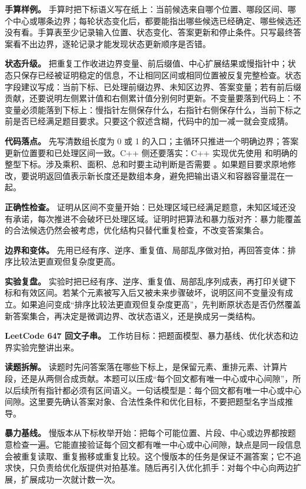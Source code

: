 \textbf{手算样例。} 手算时把下标语义写在纸上：当前候选来自哪个位置、哪段区间、哪个中心或哪条边界；每轮状态变化后，都要能指出哪些候选已经确定、哪些候选还没有看。手算表至少记录输入位置、状态变化、答案更新和停止条件。只写最终答案看不出边界，逐轮记录才能发现状态更新顺序是否错。

\textbf{状态升级。} 把重复工作收进边界变量、前后缀值、中心扩展结果或慢指针中；状态只保存已经被证明稳定的信息，不让相同区间或相同位置被反复完整检查。状态字段建议写成：当前下标、已处理前缀边界、未知区边界、答案变量；若有前后缀贡献，还要说明左侧累计值和右侧累计值分别何时更新。不变量要落到代码上：不变量必须能落到下标上：慢指针左侧保存什么，右指针右侧保存什么，当前下标之前是否已经满足题目要求。只要这个叙述含糊，代码中的加一减一就会变成猜。

\textbf{代码落点。} 先写清数组长度为 0 或 1 的入口；主循环只推进一个明确边界；答案更新位置要和已处理区间一致。C++ 侧还要落实：C++ 实现优先使用  和明确的整型下标。涉及乘积、面积、总和时要主动判断是否需要 。如果题目要求原地修改，要说明返回值表示新长度还是数组本身，避免把输出语义和容器容量混在一起。

\textbf{正确性检查。} 证明从区间不变量开始：已处理区域已经满足题意，未知区域还没有承诺，每次推进不会破坏已处理区域。证明时把算法和暴力版对齐：暴力能覆盖的合法候选仍然会被考虑，优化结构只替代重复检查，不改变答案集合。

\textbf{边界和变体。} 先用已经有序、逆序、重复值、局部乱序做对拍，再回答变体：排序比较法更直观但复杂度更高。

\textbf{实验复盘。} 实验时把已经有序、逆序、重复值、局部乱序列成表，再打印关键下标和有效区间。若某个元素被写入后又被未来步骤破坏，说明区间不变量没有成立。如果追问变成“排序比较法更直观但复杂度更高”，先判断原状态是否仍然覆盖新答案集合，再决定是微调边界、改状态语义，还是换成另一类结构。

\noindent\textbf{LeetCode 647 回文子串。} 工作坊目标：把题面模型、暴力基线、优化状态和边界实验完整讲出来。

\textbf{读题拆解。} 读题时先问答案落在哪些下标上，是保留元素、重排元素、计算片段，还是从两侧合成贡献。本题可以压成“每个回文都有唯一中心或中心间隙”，所以后续所有指针都必须有区间语义。一句话模型是：每个回文都有唯一中心或中心间隙。这里要先确认答案对象、合法性条件和优化目标，不要把题型名字当成推导。

\textbf{暴力基线。} 慢版本从下标枚举开始：把每个可能位置、片段、中心或边界都按题意检查一遍。它能直接验证每个回文都有唯一中心或中心间隙，缺点是同一段信息会被重复读取、重复搬移或重复比较。这个慢版本的任务是保证不漏答案；它不追求快，只负责给优化版提供对拍基准。随后再引入优化抓手：对每个中心向两边扩展，扩展成功一次就计数一次。

